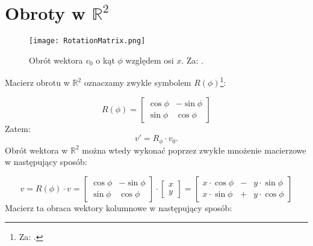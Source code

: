 \section{Obroty w \texorpdfstring{$\mathbb{R}^{2}$}{Obroty w R2}}

\begin{figure}[H]
    \centering
    \texttt{[image: RotationMatrix.png]}
    \caption{ Obrót wektora $v_{0}$ o kąt $\phi$ względem osi $x$. Za: \citep{Weisstein2000}.}
\end{figure}

Macierz obrotu w $\mathbb{R}^{2}$ oznaczamy zwykle symbolem $R(\phi)$\footnote{Za: \citep{Weisstein2000}.}:

\begin{equation*}
R(\phi) =
    \begin{bmatrix}
    \cos\phi & -\sin\phi \\
    \sin\phi & \cos\phi
    \end{bmatrix}
\end{equation*}
Zatem:
\begin{equation*}
    v' = R_{\phi} \cdot v_{0}.
\end{equation*}
Obrót wektora w $\mathbb{R}^{2}$ można wtedy wykonać poprzez zwykłe mnożenie macierzowe w następujący sposób:

\begin{equation*}
    v = R(\phi) \cdot v =
    \begin{bmatrix}
    \cos\phi & -\sin\phi \\
    \sin\phi & \cos\phi 
    \end{bmatrix}
    \cdot
    \begin{bmatrix}
    x \\
    y
    \end{bmatrix}
    =
    \begin{bmatrix}
    x \cdot \cos\phi & - & y \cdot \sin\phi \\
    x \cdot \sin\phi & + & y \cdot \cos\phi
    \end{bmatrix}
\end{equation*}
Macierz ta obraca wektory kolumnowe w następujący sposób:


